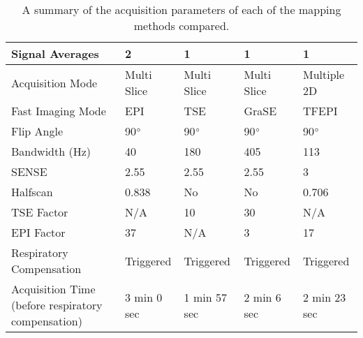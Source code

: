 \begin{table}[H]
\begin{adjustbox}{width=1.0\textwidth, center}
\begin{tabularx}{1.25\textwidth}{X|X|X|X|X}
		Signal   Averages                                    & 2                               & 1                          & 1                  & 1                   \\ \hline
		Acquisition Mode                                     & Multi Slice                     & Multi Slice                & Multi Slice        & Multiple 2D         \\ \hline
		Fast   Imaging Mode                                  & EPI                             & TSE                        & GraSE              & TFEPI               \\ \hline
		Flip Angle                                           & 90$\degree$                     & 90$\degree$                & 90$\degree$        & 90$\degree$         \\ \hline
		Bandwidth   (Hz)                                     & 40                              & 180                        & 405                & 113                 \\ \hline
		SENSE                                                & 2.55                            & 2.55                       & 2.55               & 3                   \\ \hline
		Halfscan                                             & 0.838                           & No                         & No                 & 0.706               \\ \hline
		TSE Factor                                           & N/A                             & 10                         & 30                 & N/A                 \\ \hline
		EPI Factor                                           & 37                              & N/A                        & 3                  & 17                  \\ \hline
		Respiratory Compensation                             & Triggered                       & Triggered                  & Triggered          & Triggered           \\ \hline
		Acquisition Time \scriptsize{(before respiratory compensation)} & 3 min 0 sec                & 1 min 57 sec               & 2 min 6 sec        & 2 min 23 sec  
	\end{tabularx}
	\end{adjustbox}
	\caption{A summary of the acquisition parameters of each of the \ttwo mapping methods compared.}
	\label{tab:t2_sequence_overview}
\end{table}

